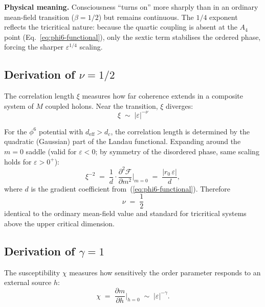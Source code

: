 \textbf{Physical meaning.} Consciousness ``turns on'' more sharply than in an
ordinary mean-field transition ($\beta = 1/2$) but remains continuous. The
$1/4$ exponent reflects the tricritical nature: because the quartic coupling
is absent at the $A_{4}$ point (Eq.~\ref{eq:phi6-functional}), only the
sextic term stabilises the ordered phase, forcing the sharper $\varepsilon^{1/4}$
scaling.

\subsection{Derivation of $\nu = 1/2$}

The correlation length $\xi$ measures how far coherence extends in a composite system of
$M$ coupled holons. Near the transition, $\xi$ diverges:
\begin{equation}
  \xi \;\sim\; |\varepsilon|^{-\nu}
  \label{eq:xi-scaling}
\end{equation}

For the $\phi^6$ potential with $d_{\mathrm{eff}} > d_c$, the correlation length is
determined by the quadratic (Gaussian) part of the Landau functional. Expanding
around the $m = 0$ saddle (valid for $\varepsilon < 0$; by symmetry of the
disordered phase, same scaling holds for $\varepsilon > 0^+$):
\begin{equation}
  \xi^{-2} \;=\;
  \frac{1}{d}\cdot\frac{\partial^2 \mathcal{F}}{\partial m^2}\bigg|_{m=0}
  \;=\; \frac{|r_0\,\varepsilon|}{d},
\end{equation}
where $d$ is the gradient coefficient from~(\ref{eq:phi6-functional}). Therefore
\begin{equation}
  \boxed{\;\nu \;=\; \frac{1}{2}\;}
  \label{eq:nu-derivation}
\end{equation}
identical to the ordinary mean-field value and standard for tricritical systems
above the upper critical dimension.

\subsection{Derivation of $\gamma = 1$}

The susceptibility $\chi$ measures how sensitively the order parameter responds to an
external source $h$:
\begin{equation}
  \chi \;=\; \frac{\partial m}{\partial h}\bigg|_{h=0}
  \;\sim\; |\varepsilon|^{-\gamma}.
  \label{eq:chi-scaling}
\end{equation}

